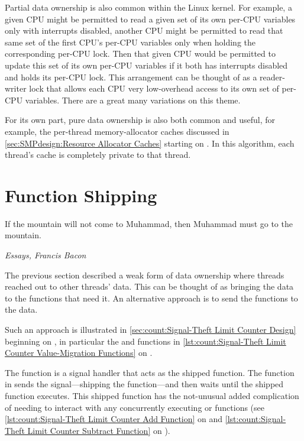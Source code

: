 Partial data ownership is also common within the Linux kernel.
For example, a given CPU might be permitted to read a given set of its
own per-CPU variables only with interrupts disabled, another CPU might
be permitted to read that same set of the first CPU's per-CPU variables
only when holding the corresponding per-CPU lock.
Then that given CPU would be permitted to update this set of its own
per-CPU variables if it both has interrupts disabled and holds its
per-CPU lock.
This arrangement can be thought of as a reader-writer lock that allows
each CPU very low-overhead access to its own set of per-CPU variables.
There are a great many variations on this theme.

For its own part, pure data ownership is also both common and useful,
for example, the per-thread memory-allocator caches discussed in
\cref{sec:SMPdesign:Resource Allocator Caches}
starting on
.
In this algorithm, each thread's cache is completely private to that
thread.

\section{Function Shipping}
\label{sec:owned:Function Shipping}
%
\epigraph{If the mountain will not come to Muhammad, then Muhammad must
	  go to the mountain.}
	 {\emph{Essays, Francis Bacon}}

The previous section described a weak form of data ownership where
threads reached out to other threads' data.
This can be thought of as bringing the data to the functions that
need it.
An alternative approach is to send the functions to the data.

Such an approach is illustrated in
\cref{sec:count:Signal-Theft Limit Counter Design}
beginning on
,
in particular the  and
 functions in
\cref{lst:count:Signal-Theft Limit Counter Value-Migration Functions}
on
.

The  function is a signal handler that
acts as the shipped function.
The  function in 
sends the signal---shipping the function---and then waits until
the shipped function executes.
This shipped function has the not-unusual added complication of
needing to interact with any concurrently executing 
or  functions (see
\cref{lst:count:Signal-Theft Limit Counter Add Function}
on
 and
\cref{lst:count:Signal-Theft Limit Counter Subtract Function}
on
).

